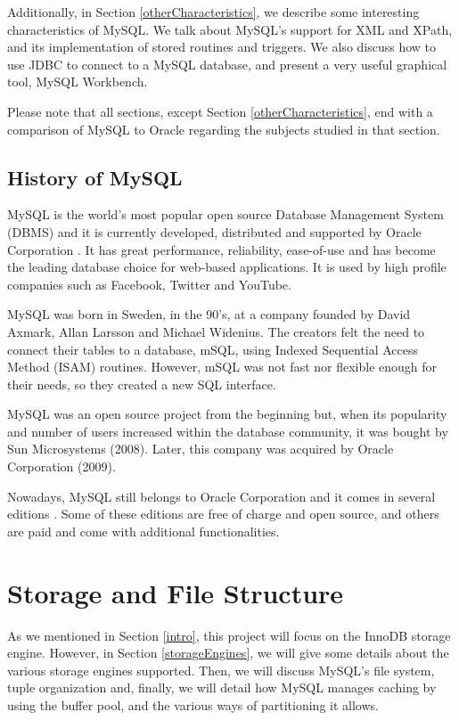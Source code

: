 \documentclass[12pt]{article}
\begin{document}
\vspace{0.2cm}

Additionally, in Section \ref{otherCharacteristics}, we describe some interesting characteristics of MySQL. We talk about MySQL's support for XML and XPath, and its implementation of stored routines and triggers. We also discuss how to use JDBC to connect to a MySQL database, and present a very useful graphical tool, MySQL Workbench.

\vspace{0.2cm}

Please note that all sections, except Section \ref{otherCharacteristics}, end with a comparison of MySQL to Oracle regarding the subjects studied in that section.

\newpage 

\subsection{History of MySQL}
\label{history}
MySQL is the world's most popular open source Database Management System (DBMS) and it is currently developed, distributed and supported by Oracle Corporation \parencite{WHATIS}. It has great performance, reliability, ease-of-use and has become the leading database choice for web-based applications. It is used by high profile companies such as Facebook, Twitter and YouTube.

\vspace{0.3cm}

MySQL was born in Sweden, in the 90's, at a company founded by David Axmark, Allan Larsson and Michael Widenius. The creators felt the need to connect their tables to a database, mSQL, using Indexed Sequential Access Method (ISAM) routines. However, mSQL was not fast nor flexible enough for their needs, so they created a new SQL interface.

MySQL was an open source project from the beginning but, when its popularity and number of users increased within the database community, it was bought by Sun Microsystems (2008). Later, this company was acquired by Oracle Corporation (2009). 

Nowadays, MySQL still belongs to Oracle Corporation and it comes in several editions \parencite{EDITIONS}. Some of these editions are free of charge and open source, and others are paid and come with additional functionalities.





\newpage
\section{Storage and File Structure}
\label{storage}
As we mentioned in Section \ref{intro}, this project will focus on the InnoDB storage engine. However, in Section \ref{storageEngines}, we will give some details about the various storage engines supported. 
Then, we will discuss MySQL's file system, tuple organization and, finally, we will detail how MySQL manages caching by using the buffer pool, and the various ways of partitioning it allows.
\end{document}
